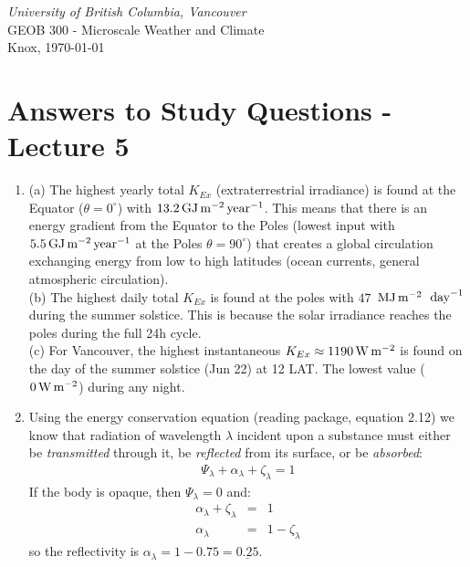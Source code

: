 \documentclass[11pt]{article}
\author{Andreas Christen}
\begin{document}
\begin{center}
\emph{University of British Columbia, Vancouver}\\
GEOB 300 - Microscale Weather and Climate\\
Knox, \today
\section*{Answers to Study Questions - Lecture 5}

\vspace{0.5cm}
\end{center}

\begin{enumerate}

\item (a) The highest yearly total $K_{Ex}$ (extraterrestrial irradiance) is found at the Equator ($\theta = 0^{\circ}$) with $13.2\,\rm{GJ}\,\rm{m}^{-2}\,\rm{year}^{-1}$. This means that there is an energy gradient from the Equator to the Poles (lowest input with $5.5\,\rm{GJ}\,\rm{m}^{-2}\,\rm{year}^{-1}$ at the Poles $\theta = 90^{\circ}$) that creates a global circulation exchanging energy from low to high latitudes (ocean currents, general atmospheric circulation).\\
(b) The highest daily total $K_{Ex}$ is found at the poles with $47$ $\,\rm{MJ}\,\rm{m}^{-2}\,$ $\rm{day}^{-1}$ during the summer solstice. This is because the solar irradiance reaches the poles during the full 24h cycle.\\
(c) For Vancouver, the highest instantaneous $K_{Ex} \approx 1190\,\rm{W}\,\rm{m}^{-2}$ is found on the day of the summer solstice (Jun 22) at 12 LAT. The lowest value ($0\,\rm{W}\,\rm{m}^{-2}$) during any night. \\

\item Using the energy conservation equation (reading package, equation 2.12) we know that radiation of wavelength $\lambda$ incident upon a substance must either be \emph{transmitted} through it, be \emph{reflected} from its surface, or be \emph{absorbed}: 
\begin{eqnarray}
\Psi_{\lambda} + \alpha_{\lambda} + \zeta_{\lambda} = 1
\label{E1}
\end{eqnarray}
If the body is opaque, then $\Psi_{\lambda} = 0$ and:
\begin{eqnarray}
\alpha_{\lambda} + \zeta_{\lambda} &=& 1 \nonumber \\
\alpha_{\lambda} &=& 1 - \zeta_{\lambda}
\end{eqnarray}
so the reflectivity is $\alpha_{\lambda} = 1 - 0.75 = \underline{0.25}$.


\end{enumerate}
\end{document}
